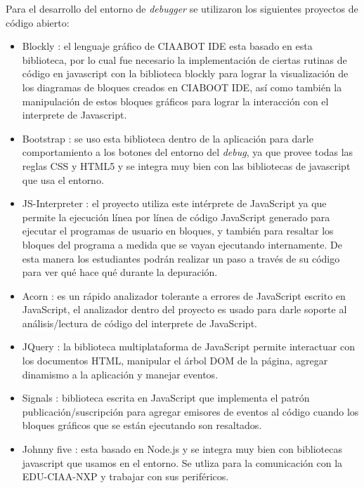 Para el desarrollo del entorno de \emph{debugger} se utilizaron los siguientes proyectos de código abierto:

\begin{itemize}
	\item Blockly \citep{blockly}: el lenguaje gráfico de CIAABOT IDE esta basado en esta biblioteca, por lo cual fue necesario la implementación de ciertas rutinas de código en javascript con la biblioteca blockly para lograr la visualización de los diagramas de bloques creados en CIABOOT IDE, así como también la manipulación de estos bloques gráficos para lograr la interacción con el interprete de Javascript. 
	
	\item Bootstrap \citep{bootstrap}: se uso esta biblioteca dentro de la aplicación para darle comportamiento a los botones del entorno del \emph{debug}, ya que provee todas las reglas CSS y HTML5 y se integra muy bien con las bibliotecas de javascript que usa el entorno.
	
	\item JS-Interpreter \citep{js-Interpreter}: el proyecto utiliza este intérprete de JavaScript ya que permite la ejecución línea por línea de código JavaScript generado para ejecutar el programas de usuario en bloques, y también para resaltar los bloques del programa a medida que se vayan ejecutando internamente. De esta manera los estudiantes podrán realizar un paso a través de su código para ver qué hace qué durante la depuración. 

	\item Acorn \citep{acorn}: es un rápido analizador tolerante a errores de JavaScript escrito en JavaScript, el analizador dentro del proyecto es usado para darle soporte al análisis/lectura de código del interprete de JavaScript.
	
	\item JQuery \citep{jQuery}: la biblioteca multiplataforma de JavaScript permite interactuar con los documentos HTML, manipular el árbol DOM de la página, agregar dinamismo a la aplicación y manejar eventos.
	
	\item Signals \citep{signals}: biblioteca escrita en JavaScript que implementa el patrón publicación/suscripción para agregar emisores de eventos al código cuando los bloques gráficos que se están ejecutando son resaltados.
	
	\item Johnny five \citep{johnny}: esta basado en Node.js y se integra muy bien con bibliotecas javascript que usamos en el entorno. Se utliza para la comunicación con la EDU-CIAA-NXP y trabajar con sus periféricos.
	

\end{itemize}
